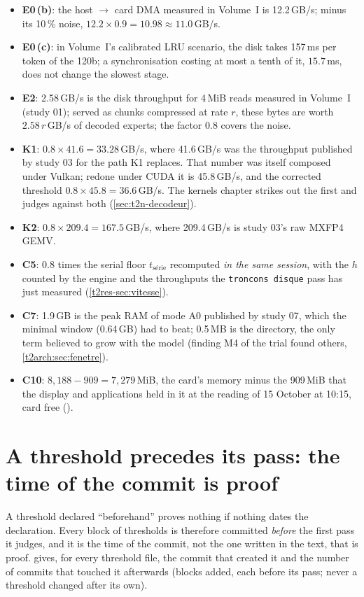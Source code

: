 \begin{itemize}
\item \textbf{E0\,(b)}: the host $\to$ card DMA measured in Volume~I is 12.2\,GB/s; minus its 10\,\% noise, $12.2 \times 0.9 = 10.98 \approx 11.0$\,GB/s.
\item \textbf{E0\,(c)}: in Volume~I's calibrated LRU scenario, the disk takes 157\,ms per token of the 120b; a synchronisation costing at most a tenth of it, $15.7$\,ms, does not change the slowest stage.
\item \textbf{E2}: 2.58\,GB/s is the disk throughput for 4\,MiB reads measured in Volume~I (study 01); served as chunks compressed at rate $r$, these bytes are worth $2.58\,r$\,GB/s of decoded experts; the factor $0.8$ covers the noise.
\item \textbf{K1}: $0.8 \times 41.6 = 33.28$\,GB/s, where 41.6\,GB/s was the throughput published by study 03 for the path K1 replaces. That number was itself composed under Vulkan; redone under CUDA it is 45.8\,GB/s, and the corrected threshold $0.8 \times 45.8 = 36.6$\,GB/s. The kernels chapter strikes out the first and judges against both (\cref{sec:t2n-decodeur}).
\item \textbf{K2}: $0.8 \times 209.4 = 167.5$\,GB/s, where 209.4\,GB/s is study 03's raw MXFP4 GEMV.
\item \textbf{C5}: $0.8$ times the serial floor $t_{\text{série}}$ recomputed \emph{in the same session}, with the $h$ counted by the engine and the throughputs the \texttt{troncons disque} pass has just measured (\cref{t2res-sec:vitesse}).
\item \textbf{C7}: 1.9\,GB is the peak RAM of mode A0 published by study 07, which the minimal window (0.64\,GB) had to beat; 0.5\,MB is the directory, the only term believed to grow with the model (finding M4 of the trial found others, \cref{t2arch:sec:fenetre}).
\item \textbf{C10}: $8{,}188 - 909 = 7{,}279$\,MiB, the card's memory minus the 909\,MiB that the display and applications held in it at the reading of 15 October at 10:15, card free ().
\end{itemize}

\section{A threshold precedes its pass: the time of the commit is proof}\label{t2ann:sec:heure}

A threshold declared \enquote{beforehand} proves nothing if nothing dates the declaration. Every block of thresholds is therefore committed \emph{before} the first pass it judges, and it is the time of the commit, not the one written in the text, that is proof.  gives, for every threshold file, the commit that created it and the number of commits that touched it afterwards (blocks added, each before its pass; never a threshold changed after its own).

